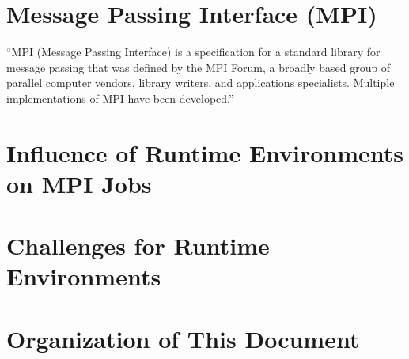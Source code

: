 \section{Message Passing Interface (MPI)}
\label{sec:Introduction}
``MPI (Message Passing Interface) is a specification for a standard library for message passing that was defined by the MPI Forum, a broadly based group of parallel computer vendors, library writers, and applications specialists. Multiple implementations of MPI have been developed.''~\cite{gropp1996high}

\section{Influence of Runtime Environments on MPI Jobs}
\label{sec:Introduction}


\section{Challenges for Runtime Environments}
\label{sec:Introduction}


\section{Organization of This Document}
\label{sec:Introduction}

